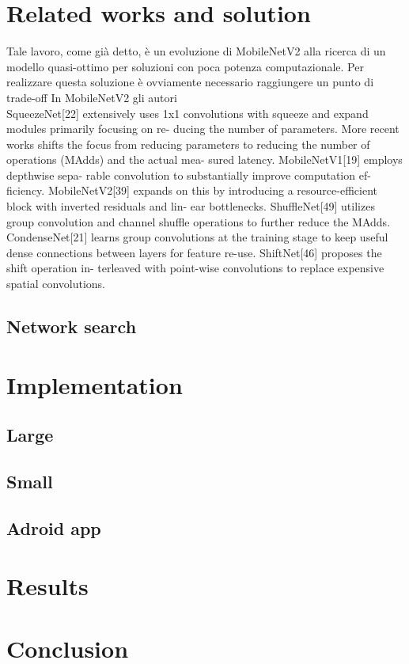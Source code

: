 \documentclass[12pt, letterpaper, twoside]{article}
\begin{document}
\section{Related works and solution}
Tale lavoro, come già detto, è un evoluzione di MobileNetV2 alla ricerca di un modello quasi-ottimo per soluzioni con poca potenza computazionale. Per realizzare questa soluzione è ovviamente necessario raggiungere un punto di trade-off 
In MobileNetV2 gli autori \\

SqueezeNet[22] extensively uses 1x1 convolutions with
squeeze and expand modules primarily focusing on re-
ducing the number of parameters. More recent works
shifts the focus from reducing parameters to reducing
the number of operations (MAdds) and the actual mea-
sured latency. MobileNetV1[19] employs depthwise sepa-
rable convolution to substantially improve computation ef-
ficiency. MobileNetV2[39] expands on this by introducing
a resource-efficient block with inverted residuals and lin-
ear bottlenecks. ShuffleNet[49] utilizes group convolution
and channel shuffle operations to further reduce the MAdds.
CondenseNet[21] learns group convolutions at the training
stage to keep useful dense connections between layers for
feature re-use. ShiftNet[46] proposes the shift operation in-
terleaved with point-wise convolutions to replace expensive
spatial convolutions.

\subsection{Network search}


\newpage
\section{Implementation}
\subsection{Large}
\subsection{Small}
\subsection{Adroid app}

\newpage
\section{Results}
\newpage


\newpage
\section{Conclusion}


\newpage

\nocite{*}
\printbibliography[heading=bibintoc,title={References}]
\end{document}
